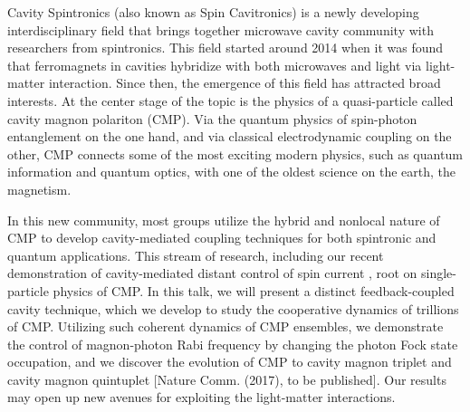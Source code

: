 Cavity Spintronics (also known as Spin Cavitronics) is a newly developing interdisciplinary field that brings together microwave cavity community with researchers from spintronics. This field started around 2014 when it was found that ferromagnets in cavities hybridize with both microwaves and light via light-matter interaction. Since then, the emergence of this field has attracted broad interests. At the center stage of the topic is the physics of a quasi-particle called cavity magnon polariton (CMP). Via the quantum physics of spin-photon entanglement on the one hand, and via classical electrodynamic coupling on the other, CMP connects some of the most exciting modern physics, such as quantum information and quantum optics, with one of the oldest science on the earth, the magnetism. 

In this new community, most groups utilize the hybrid and nonlocal nature of CMP to develop cavity-mediated coupling techniques for both spintronic and quantum applications. This stream of research, including our recent demonstration of cavity-mediated distant control of spin current \cite{Bai_2017}, root on single-particle physics of CMP. In this talk, we will present a distinct feedback-coupled cavity technique, which we develop to study the cooperative dynamics of trillions of CMP. Utilizing such coherent dynamics of CMP ensembles, we demonstrate the control of magnon-photon Rabi frequency by changing the photon Fock state occupation, and we discover the evolution of CMP to cavity magnon triplet and cavity magnon quintuplet [Nature Comm. (2017), to be published]. Our results may open up new avenues for exploiting the light-matter interactions.